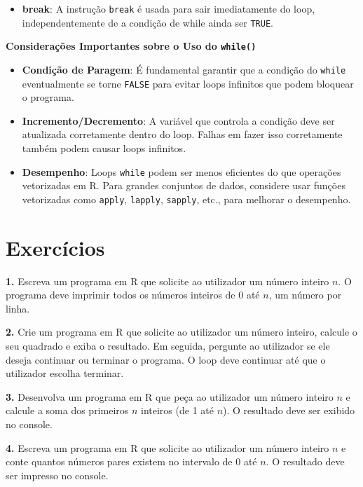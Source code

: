 \documentclass[
]{book}
\providecommand{\tightlist}{%
  \setlength{\itemsep}{0pt}\setlength{\parskip}{0pt}}
\begin{document}
\begin{itemize}
\tightlist
\item
  \textbf{break}: A instrução \texttt{break} é usada para sair imediatamente do
  loop, independentemente de a condição de while ainda ser \texttt{TRUE}.
\end{itemize}

\textbf{Considerações Importantes sobre o Uso do \texttt{while()}}

\begin{itemize}
\item
  \textbf{Condição de Paragem}: É fundamental garantir que a condição do
  \texttt{while} eventualmente se torne \texttt{FALSE} para evitar loops infinitos
  que podem bloquear o programa.
\item
  \textbf{Incremento/Decremento}: A variável que controla a condição deve
  ser atualizada corretamente dentro do loop. Falhas em fazer isso
  corretamente também podem causar loops infinitos.
\item
  \textbf{Desempenho}: Loops \texttt{while} podem ser menos eficientes do que
  operações vetorizadas em R. Para grandes conjuntos de dados,
  considere usar funções vetorizadas como \texttt{apply}, \texttt{lapply}, \texttt{sapply},
  etc., para melhorar o desempenho.
\end{itemize}

\section{Exercícios}\label{exercuxedcios-11}

\textbf{1.} Escreva um programa em R que solicite ao utilizador um número
inteiro \(n\). O programa deve imprimir todos os números inteiros de 0 até
\(n\), um número por linha.

\textbf{2.} Crie um programa em R que solicite ao utilizador um número
inteiro, calcule o seu quadrado e exiba o resultado. Em seguida,
pergunte ao utilizador se ele deseja continuar ou terminar o programa. O
loop deve continuar até que o utilizador escolha terminar.

\textbf{3.} Desenvolva um programa em R que peça ao utilizador um número
inteiro \(n\) e calcule a soma dos primeiros \(n\) inteiros (de 1 até \(n\)).
O resultado deve ser exibido no console.

\textbf{4.} Escreva um programa em R que solicite ao utilizador um número
inteiro \(n\) e conte quantos números pares existem no intervalo de 0 até
\(n\). O resultado deve ser impresso no console.
\end{document}
